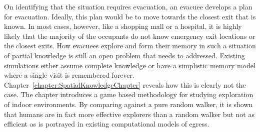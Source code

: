 On identifying that the situation requires evacuation, an evacuee develops a plan for evacuation. Ideally, this plan would be to move towards the closest exit that is known. In most cases, however, like a shopping mall or a hospital, it is highly likely that the majority of the occupants do not know emergency exit locations or the closest exits. How evacuees explore and form their memory in such a situation of partial knowledge is still an open problem that needs to addressed. Existing simulations either assume complete knowledge or have a simplistic memory model where a single visit is remembered forever. Chapter~\ref{chapter:SpatialKnowledgeChapter} reveals how this is clearly not the case. The chapter introduces a game based methodology for studying exploration of indoor environments. By comparing against a pure random walker, it is shown that humans are in fact more effective explorers than a random walker but not as efficient as is portrayed in existing computational models of egress.




